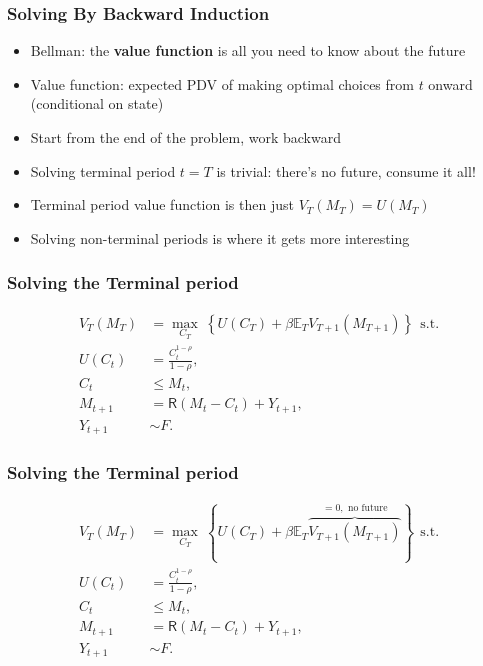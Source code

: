 \documentclass[aspectratio=169]{beamer}
\newcommand{\E}{\mathbb{E}}
\begin{document}
\begin{frame}
\frametitle{Solving By Backward Induction}

\begin{itemize}
	\item Bellman: the \textbf{value function} is all you need to know about the future
	
	\item Value function: expected PDV of making optimal choices from $t$ onward (conditional on state)
	
	\item Start from the end of the problem, work backward
	
	\item Solving terminal period $t=T$ is trivial: there's no future, consume it all!
	
	\item Terminal period value function is then just $V_T(M_T) = U(M_T)$
	
	\item Solving non-terminal periods is where it gets more interesting
\end{itemize}
\end{frame}


\begin{frame}
\frametitle{Solving the Terminal period}

\begin{align*}
V_T(M_T) &= \max_{C_T} ~ \left\{ U(C_T) + \beta \E_T V_{T+1}(M_{T+1}) \right\} ~~\text{s.t.} \\
U(C_t) &= \frac{C_t^{1-\rho}}{1-\rho}, \\
C_t &\leq M_t, \\
M_{t+1} &= \mathsf{R} (M_t - C_t) + Y_{t+1}, \\
Y_{t+1} &\sim F.
\end{align*}
\end{frame}


\begin{frame}
\frametitle{Solving the Terminal period}

\begin{align*}
V_T(M_T) &= \max_{C_T} ~ \left\{ U(C_T) + \beta \E_T \overbrace{V_{T+1}(M_{T+1})}^{=0, \text{ no future}} \right\} ~~\text{s.t.} \\
U(C_t) &= \frac{C_t^{1-\rho}}{1-\rho}, \\
C_t &\leq M_t, \\
M_{t+1} &= \mathsf{R} (M_t - C_t) + Y_{t+1}, \\
Y_{t+1} &\sim F.
\end{align*}
\end{frame}
\end{document}
